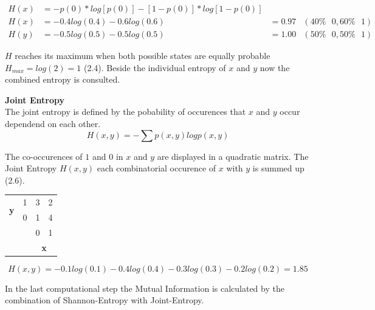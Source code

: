 \begin{align}
H(x) & = -p(0)*log[p(0)]-[1-p(0)]*log[1-p(0)]\\
H(x) & = -0.4log(0.4)-0.6log(0.6) & = 0.97 & (40\% \text{ }0, 60\% \text{ }1)\\
H(y) & = -0.5log(0.5)-0.5log(0.5) & = 1.00 & (50\% \text{ }0, 50\% \text{ }1)
\end{align}

$H$ reaches its maximum when both possible states are equally probable $H_{max}=log(2)=1$ (2.4). Beside the individual entropy of $x$ and $y$ now the combined entropy is consulted.

\begin{defn}\textbf{Joint Entropy}\\
The joint entropy is defined by the pobability of occurences that $x$ and $y$ occur dependend on each other.
\begin{equation}
H(x,y)=-\sum p(x,y)log p(x,y)
\end{equation}
\end{defn}
\begin{exmp}
The co-occurences of $1$ and $0$ in $x$ and $y$ are displayed in a quadratic matrix. The Joint Entropy $H(x,y)$ each combinatorial occurence of $x$ with $y$ is summed up (2.6).
\end{exmp}
\begin{center}
\begin{tabular}{llll}
\cline{3-4}
\multicolumn{1}{c}{\multirow{2}{*}{\textbf{y}}} & \multicolumn{1}{l|}{1} & \multicolumn{1}{l|}{3} & \multicolumn{1}{l|}{2} \\ \cline{3-4} 
\multicolumn{1}{c}{}                            & \multicolumn{1}{l|}{0} & \multicolumn{1}{l|}{1} & \multicolumn{1}{l|}{4} \\ \cline{3-4} 
                                                &                        & 0                      & 1                      \\
                                                &                        & \multicolumn{2}{c}{\textbf{x}}                 
\end{tabular}
\end{center}

\begin{equation}
H(x,y)= -0.1log(0.1) - 0.4 log (0.4) - 0.3 log (0.3) - 0.2 log (0.2) = 1.85
\end{equation}

In the last computational step the Mutual Information is calculated by the combination of Shannon-Entropy with Joint-Entropy.

